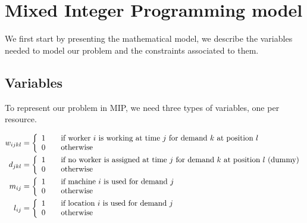 \documentclass[../../thesis.tex]{subfiles}
\begin{document}
\section{Mixed Integer Programming model}
\label{section:mipmodel}

We first start by presenting the mathematical model, we describe the variables
needed to model our problem and the constraints associated to them.

\subsection{Variables}

To represent our problem in MIP, we need three types of variables, one per resource.



\begin{equation*}
\begin{split}
    w_{ijkl} &=  \left \{
                   \begin{array}{l l}
                      1 \quad & \textrm{if worker $i$ is working at time $j$ for demand $k$ at position $l$} \\
                      0 \quad & \textrm{otherwise} 
                   \end{array}
                   \right . \\
  d_{jkl} &=  \left \{
  \begin{array}{l l}
      1 \quad & \textrm{if no worker is assigned at time $j$ for demand $k$ at position $l$ (dummy)} \\
      0 \quad & \textrm{otherwise} 
  \end{array}
  \right . \\
   m_{ij} &=  \left \{
                   \begin{array}{l l}
                      1 \quad & \textrm{if machine $i$ is used for demand $j$} \\
                      0 \quad & \textrm{otherwise} 
                   \end{array}
                   \right . \\
    l_{ij} &= \left \{
               \begin{array}{l l}
                  1 \quad & \textrm{if location $i$ is used for demand $j$} \\
                  0 \quad & \textrm{otherwise} 
               \end{array}
               \right . \\
\end{split}
\end{equation*}
\end{document}
